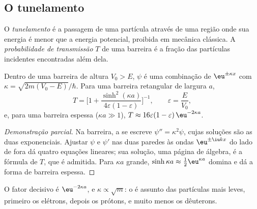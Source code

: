 \subsection*{O tunelamento}

\begin{definition}\label{def:b3:quantum-model-systems:tunnelling}
O \emph{tunelamento} é a passagem de uma partícula através
de uma região onde sua energia é menor que a energia potencial, proibida em
mecânica clássica. A \emph{probabilidade de transmissão}
$T$ de uma barreira é a fração das partículas incidentes encontradas
além dela.
\end{definition}

\begin{proposition}\label{prop:b3:quantum-model-systems:barrier}
Dentro de uma barreira de altura $V_0 > E$, $\psi$ é uma combinação de
$\eu^{\pm\kappa x}$ com $\kappa = \sqrt{2m(V_0 - E)}/\hbar$. Para uma barreira
retangular de largura $a$,
\[
T = \Big[1 + \frac{\sinh^2(\kappa a)}{4\varepsilon(1-\varepsilon)}\Big]^{-1},
\qquad \varepsilon = \frac{E}{V_0},
\]
e, para uma barreira espessa ($\kappa a \gg 1$), $T \approx 16\varepsilon(1-\varepsilon)
\,\eu^{-2\kappa a}$.
\end{proposition}

\begin{proof}[Demonstração parcial]
Na barreira, a  se escreve $\psi'' = \kappa^2\psi$, cujas
soluções são as duas exponenciais. Ajustar $\psi$ e $\psi'$ nas duas
paredes às ondas $\eu^{\pm\iu kx}$ do lado de fora dá quatro equações lineares; sua
solução, uma página de álgebra, é a fórmula de $T$, que é admitida. Para
$\kappa a$ grande, $\sinh\kappa a \approx \frac12\eu^{\kappa a}$ domina e
dá a forma de barreira espessa.
\end{proof}

O fator decisivo é $\eu^{-2\kappa a}$, e $\kappa \propto \sqrt m$: o
 é assunto das partículas mais leves, primeiro os elétrons,
depois os prótons, e muito menos os dêuterons.

